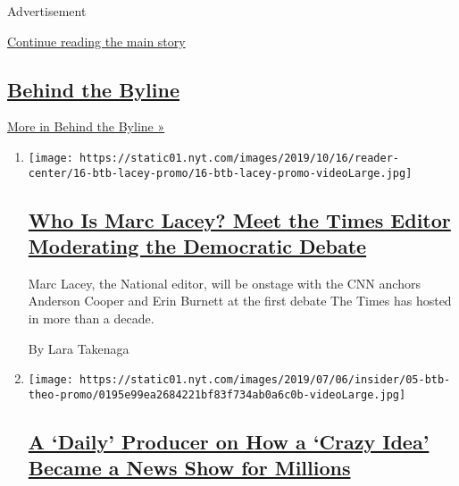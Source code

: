 Advertisement

\protect\hyperlink{after-mid3}{Continue reading the main story}

\hypertarget{behind-the-byline}{%
\subsection{\texorpdfstring{\href{/column/behind-the-byline}{Behind the
Byline}}{Behind the Byline}}\label{behind-the-byline}}

\href{/column/behind-the-byline}{More in Behind the Byline »}

\begin{enumerate}
\def\labelenumi{\arabic{enumi}.}
\item
  \texttt{[image: https://static01.nyt.com/images/2019/10/16/reader-center/16-btb-lacey-promo/16-btb-lacey-promo-videoLarge.jpg]}

  \hypertarget{who-is-marc-lacey-meet-the-times-editor-moderating-the-democratic-debate}{%
  \subsection{\texorpdfstring{\href{/2019/10/14/reader-center/marc-lacey-debate.html}{Who
  Is Marc Lacey? Meet the Times Editor Moderating the Democratic
  Debate}}{Who Is Marc Lacey? Meet the Times Editor Moderating the Democratic Debate}}\label{who-is-marc-lacey-meet-the-times-editor-moderating-the-democratic-debate}}

  Marc Lacey, the National editor, will be onstage with the CNN anchors
  Anderson Cooper and Erin Burnett at the first debate The Times has
  hosted in more than a decade.

  By Lara Takenaga
\item
  \texttt{[image: https://static01.nyt.com/images/2019/07/06/insider/05-btb-theo-promo/0195e99ea2684221bf83f734ab0a6c0b-videoLarge.jpg]}

  \hypertarget{a-daily-producer-on-how-a-crazy-idea-became-a-news-show-for-millions}{%
  \subsection{\texorpdfstring{\href{/2019/07/05/reader-center/behind-the-byline-theo-balcomb.html}{A
  `Daily' Producer on How a `Crazy Idea' Became a News Show for
  Millions}}{A `Daily' Producer on How a `Crazy Idea' Became a News Show for Millions}}\label{a-daily-producer-on-how-a-crazy-idea-became-a-news-show-for-millions}}


\end{enumerate}
